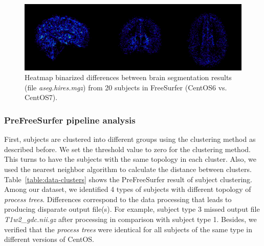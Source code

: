 \documentclass[a4paper,num-refs]{oup-contemporary}
\begin{document}
\begin{figure}
\centering
  \includegraphics[width=\columnwidth]{images/brain_classification.png} 
  \caption{Heatmap binarized differences between brain segmentation results (file \emph{aseg.hires.mgz}) from 
          20 subjects in FreeSurfer (CentOS6 vs. CentOS7).} 
  \label{fig:tissue_class}
\end{figure}


\subsubsection{PreFreeSurfer pipeline analysis} 

First, subjects are clustered into different groups using the clustering method as described before.
We set the threshold value to zero for the clustering method. 
This turns to have the subjects with the same topology in each cluster.
Also, we used the nearest neighbor algorithm to calculate the distance between clusters.
Table~\ref{table:data-clusters} shows the PreFreeSurfer result of subject clustering. 
Among our dataset, we identified 4 types of subjects with 
different topology of \emph{process trees}. 
Differences correspond to the data processing that leads to producing disparate output file(s).
For example, subject type 3 missed output file \emph{T1w2\_gdc.nii.gz} after processing 
in comparison with subject type 1.
Besides, we verified that 
the \emph{process trees} were identical for all subjects of the same type in 
different versions of CentOS.
\end{document}
